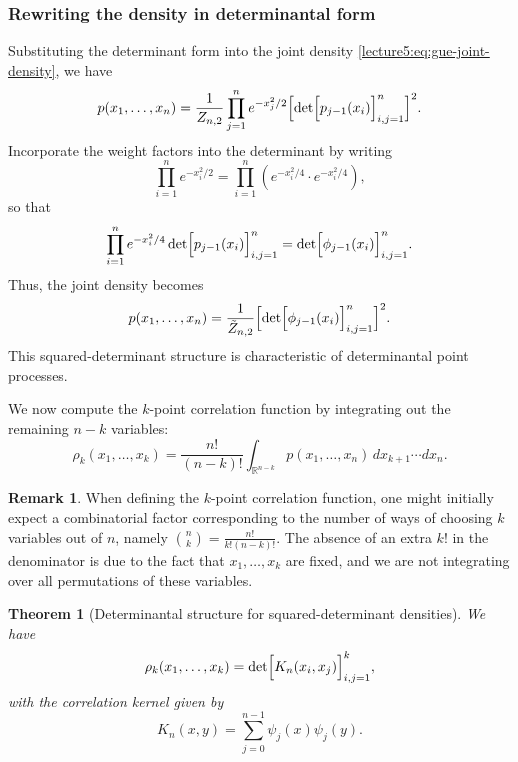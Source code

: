 \documentclass[letterpaper,11pt,oneside,reqno]{book}
\numberwithin{equation}{chapter}  %
\newtheorem{theorem}[proposition]{Theorem}
\theoremstyle{definition}
\newtheorem{remark}[proposition]{Remark}
\begin{document}
\subsubsection{Rewriting the density in determinantal form}

Substituting the determinant form into the joint density \eqref{lecture5:eq:gue-joint-density}, we have
\[
p(x_1,\dots,x_n)= \frac{1}{Z_{n,2}}\prod_{j=1}^n e^{-x_j^2/2} \Bigl[\det\Bigl[p_{j-1}(x_i)\Bigr]_{i,j=1}^n\Bigr]^2.
\]
Incorporate the weight factors into the determinant by writing
\[
\prod_{i=1}^n e^{-x_i^2/2} = \prod_{i=1}^n \left(e^{-x_i^2/4}\cdot e^{-x_i^2/4}\right),
\]
so that
\[
\prod_{i=1}^n e^{-x_i^2/4}\det\Bigl[p_{j-1}(x_i)\Bigr]_{i,j=1}^n = \det\Bigl[\phi_{j-1}(x_i)\Bigr]_{i,j=1}^n.
\]
Thus, the joint density becomes
\[
p(x_1,\dots,x_n)=\frac{1}{\tilde{Z}_{n,2}} \Bigl[\det\Bigl[\phi_{j-1}(x_i)\Bigr]_{i,j=1}^n\Bigr]^2.
\]
This squared-determinant structure is characteristic of determinantal point processes.

We now compute the $k$-point correlation function by integrating out the remaining $n-k$ variables:
\begin{equation}
\label{lecture5:eq:k-point-corr}
	\rho_k(x_1,\dots,x_k)=\frac{n!}{(n-k)!}\int_{\mathbb{R}^{n-k}} p(x_1,\dots,x_n) \,dx_{k+1}\cdots dx_n.
\end{equation}
\begin{remark}
When defining the \(k\)-point correlation function, one might initially expect a combinatorial factor corresponding to the number of ways of choosing \(k\) variables out of \(n\), namely \(\binom{n}{k} = \frac{n!}{k!(n-k)!}\).
The absence of an extra \(k!\) in the denominator is due to the fact that $x_1,\ldots,x_k $
are fixed, and we are not integrating over all permutations of these variables.
\end{remark}




\begin{theorem}[Determinantal structure for squared-determinant densities]
\label{lecture5:thm:determinantal}
We have
\[
\rho_k(x_1,\dots,x_k)=\det\Bigl[K_n(x_i,x_j)\Bigr]_{i,j=1}^k,
\]
with the correlation kernel given by
\[
K_n(x,y)=\sum_{j=0}^{n-1}\psi_j(x)\psi_j(y).
\]
\end{theorem}
\end{document}
